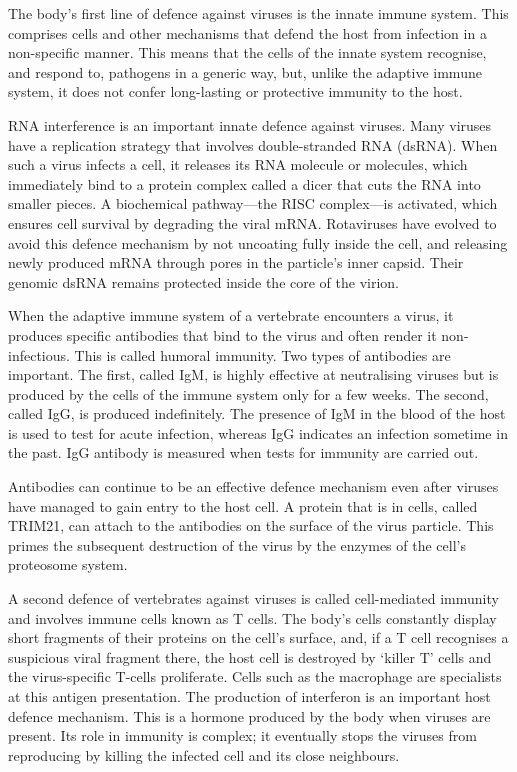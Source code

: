The body's first line of defence against viruses is the innate immune system. This comprises cells and other mechanisms that defend the host from infection in a non-specific manner. This means that the cells of the innate system recognise, and respond to, pathogens in a generic way, but, unlike the adaptive immune system, it does not confer long-lasting or protective immunity to the host.

RNA interference is an important innate defence against viruses. Many viruses have a replication strategy that involves double-stranded RNA (dsRNA). When such a virus infects a cell, it releases its RNA molecule or molecules, which immediately bind to a protein complex called a dicer that cuts the RNA into smaller pieces. A biochemical pathway---the RISC complex---is activated, which ensures cell survival by degrading the viral mRNA. Rotaviruses have evolved to avoid this defence mechanism by not uncoating fully inside the cell, and releasing newly produced mRNA through pores in the particle's inner capsid. Their genomic dsRNA remains protected inside the core of the virion.

When the adaptive immune system of a vertebrate encounters a virus, it produces specific antibodies that bind to the virus and often render it non-infectious. This is called humoral immunity. Two types of antibodies are important. The first, called IgM, is highly effective at neutralising viruses but is produced by the cells of the immune system only for a few weeks. The second, called IgG, is produced indefinitely. The presence of IgM in the blood of the host is used to test for acute infection, whereas IgG indicates an infection sometime in the past. IgG antibody is measured when tests for immunity are carried out.

Antibodies can continue to be an effective defence mechanism even after viruses have managed to gain entry to the host cell. A protein that is in cells, called TRIM21, can attach to the antibodies on the surface of the virus particle. This primes the subsequent destruction of the virus by the enzymes of the cell's proteosome system.

A second defence of vertebrates against viruses is called cell-mediated immunity and involves immune cells known as T cells. The body's cells constantly display short fragments of their proteins on the cell's surface, and, if a T cell recognises a suspicious viral fragment there, the host cell is destroyed by `killer T' cells and the virus-specific T-cells proliferate. Cells such as the macrophage are specialists at this antigen presentation. The production of interferon is an important host defence mechanism. This is a hormone produced by the body when viruses are present. Its role in immunity is complex; it eventually stops the viruses from reproducing by killing the infected cell and its close neighbours.


